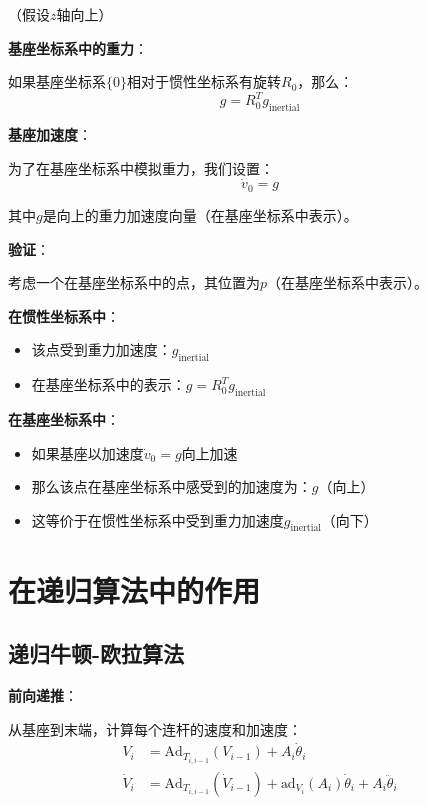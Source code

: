 \documentclass[12pt,a4paper]{article}
\begin{document}
（假设$z$轴向上）

\textbf{基座坐标系中的重力}：

如果基座坐标系$\{0\}$相对于惯性坐标系有旋转$R_0$，那么：
\begin{equation}
g = R_0^T g_{\text{inertial}}
\end{equation}

\textbf{基座加速度}：

为了在基座坐标系中模拟重力，我们设置：
\begin{equation}
\dot{v}_0 = g
\end{equation}

其中$g$是向上的重力加速度向量（在基座坐标系中表示）。

\textbf{验证}：

考虑一个在基座坐标系中的点，其位置为$p$（在基座坐标系中表示）。

\textbf{在惯性坐标系中}：
\begin{itemize}
\item 该点受到重力加速度：$g_{\text{inertial}}$
\item 在基座坐标系中的表示：$g = R_0^T g_{\text{inertial}}$
\end{itemize}

\textbf{在基座坐标系中}：
\begin{itemize}
\item 如果基座以加速度$\dot{v}_0 = g$向上加速
\item 那么该点在基座坐标系中感受到的加速度为：$g$（向上）
\item 这等价于在惯性坐标系中受到重力加速度$g_{\text{inertial}}$（向下）
\end{itemize}

\section{在递归算法中的作用}

\subsection{递归牛顿-欧拉算法}

\textbf{前向递推}：

从基座到末端，计算每个连杆的速度和加速度：
\begin{align}
V_i &= \text{Ad}_{T_{i,i-1}}(V_{i-1}) + A_i \dot{\theta}_i \tag{8.51} \\
\dot{V}_i &= \text{Ad}_{T_{i,i-1}}(\dot{V}_{i-1}) + \text{ad}_{V_i}(A_i)\dot{\theta}_i + A_i \ddot{\theta}_i \tag{8.52}
\end{align}
\end{document}
